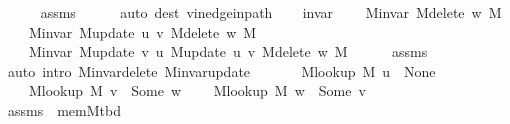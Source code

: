 \begin{isabellebody}
\ \ \ \ \isamarkupfalse%
\ assms{\isacharparenleft}{\kern0pt}{}{\isacharparenright}{\kern0pt}\isanewline
\ \ \ \ \isamarkupfalse%
\ {\isacharparenleft}{\kern0pt}auto\ dest{\isacharcolon}{\kern0pt}\ v{\isacharunderscore}{\kern0pt}in{\isacharunderscore}{\kern0pt}edge{\isacharunderscore}{\kern0pt}in{\isacharunderscore}{\kern0pt}path{\isacharparenright}{\kern0pt}\isanewline
\ \ \isamarkupfalse%
\ invar{\isacharcolon}{\kern0pt}\isanewline
\ \ \ \ {\isachardoublequoteopen}M{\isachardot}{\kern0pt}invar\ {\isacharparenleft}{\kern0pt}M{\isacharunderscore}{\kern0pt}delete\ w\ M{\isacharparenright}{\kern0pt}{\isachardoublequoteclose}\isanewline
\ \ \ \ {\isachardoublequoteopen}M{\isachardot}{\kern0pt}invar\ {\isacharparenleft}{\kern0pt}M{\isacharunderscore}{\kern0pt}update\ u\ v\ {\isacharparenleft}{\kern0pt}M{\isacharunderscore}{\kern0pt}delete\ w\ M{\isacharparenright}{\kern0pt}{\isacharparenright}{\kern0pt}{\isachardoublequoteclose}\isanewline
\ \ \ \ {\isachardoublequoteopen}M{\isachardot}{\kern0pt}invar\ {\isacharparenleft}{\kern0pt}M{\isacharunderscore}{\kern0pt}update\ v\ u\ {\isacharparenleft}{\kern0pt}M{\isacharunderscore}{\kern0pt}update\ u\ v\ {\isacharparenleft}{\kern0pt}M{\isacharunderscore}{\kern0pt}delete\ w\ M{\isacharparenright}{\kern0pt}{\isacharparenright}{\kern0pt}{\isacharparenright}{\kern0pt}{\isachardoublequoteclose}\isanewline
\ \ \ \ \isamarkupfalse%
\ assms{\isacharparenleft}{\kern0pt}{}{\isacharparenright}{\kern0pt}\isanewline
\ \ \ \ \isamarkupfalse%
\ {\isacharparenleft}{\kern0pt}auto\ intro{\isacharcolon}{\kern0pt}\ M{\isachardot}{\kern0pt}invar{\isacharunderscore}{\kern0pt}delete\ M{\isachardot}{\kern0pt}invar{\isacharunderscore}{\kern0pt}update{\isacharparenright}{\kern0pt}\isanewline
\ \ \isamarkupfalse%
\isanewline
\ \ \ \ {\isachardoublequoteopen}M{\isacharunderscore}{\kern0pt}lookup\ M\ u\ {\isacharequal}{\kern0pt}\ None{\isachardoublequoteclose}\isanewline
\ \ \ \ {\isachardoublequoteopen}M{\isacharunderscore}{\kern0pt}lookup\ M\ v\ {\isacharequal}{\kern0pt}\ Some\ w{\isachardoublequoteclose}\isanewline
\ \ \ \ {\isachardoublequoteopen}M{\isacharunderscore}{\kern0pt}lookup\ M\ w\ {\isacharequal}{\kern0pt}\ Some\ v{\isachardoublequoteclose}\isanewline
\ \ \ \ \isamarkupfalse%
\ assms{\isacharparenleft}{\kern0pt}{}{\isacharcomma}{\kern0pt}\ {}{\isacharparenright}{\kern0pt}\ mem{\isacharunderscore}{\kern0pt}M{\isacharunderscore}{\kern0pt}tbd{\isacharparenleft}{\kern0pt}{}{\isacharparenright}{\kern0pt}\isanewline

\end{isabellebody}
